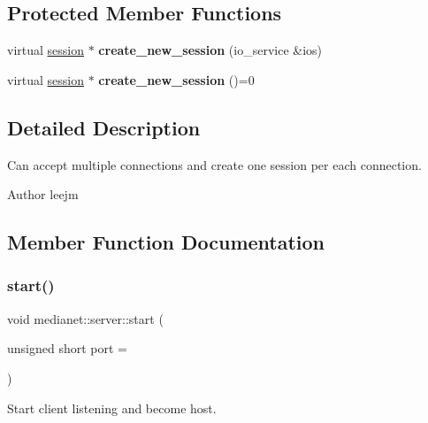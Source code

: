 \subsection*{Protected Member Functions}
\begin{DoxyCompactItemize}
\item 
\mbox{\label{classmedianet_1_1server_ae8c50db6375ec58b489ecb33d1410b1e}} 
virtual \mbox{\hyperlink{classmedianet_1_1session}{session}} $\ast$ {\bfseries create\+\_\+new\+\_\+session} (io\+\_\+service \&ios)
\item 
\mbox{\label{classmedianet_1_1network__service__interface_a951d00b17cf7021c2f66d29495b46880}} 
virtual \mbox{\hyperlink{classmedianet_1_1session}{session}} $\ast$ {\bfseries create\+\_\+new\+\_\+session} ()=0
\end{DoxyCompactItemize}


\subsection{Detailed Description}
Can accept multiple connections and create one session per each connection. 

\begin{DoxyAuthor}{Author}
leejm 
\end{DoxyAuthor}


\subsection{Member Function Documentation}
\mbox{\label{classmedianet_1_1server_a4765c462ea91a316816ef5db8592705d}} 
\subsubsection{\texorpdfstring{start()}{start()}}
{\footnotesize\ttfamily void medianet\+::server\+::start (\begin{DoxyParamCaption}\item[{unsigned short}]{port = {} }\end{DoxyParamCaption})}



Start client listening and become host. 


